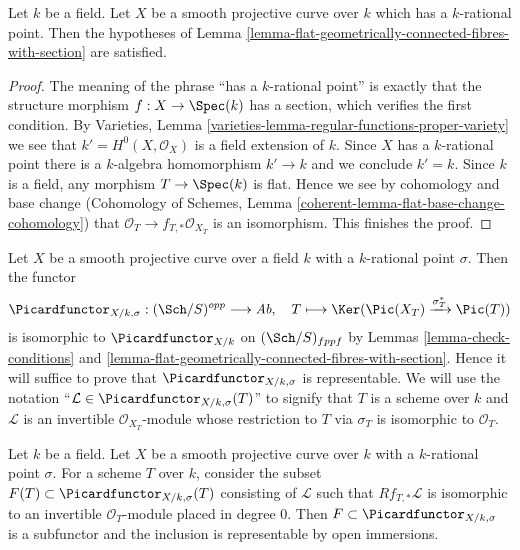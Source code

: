 \begin{lemma}
\label{lemma-check-conditions}
Let $k$ be a field. Let $X$ be a smooth projective curve over $k$
which has a $k$-rational point. Then the hypotheses of
Lemma \ref{lemma-flat-geometrically-connected-fibres-with-section}
are satisfied.
\end{lemma}

\begin{proof}
The meaning of the phrase ``has a $k$-rational point'' is exactly that
the structure morphism $f : X \to \Spec(k)$ has a section, which
verifies the first condition.
By Varieties, Lemma \ref{varieties-lemma-regular-functions-proper-variety}
we see that $k' = H^0(X, \mathcal{O}_X)$ is a field extension of $k$.
Since $X$ has a $k$-rational point there is a $k$-algebra homomorphism
$k' \to k$ and we conclude $k' = k$.
Since $k$ is a field, any morphism $T \to \Spec(k)$ is flat.
Hence we see by cohomology and base change
(Cohomology of Schemes, Lemma \ref{coherent-lemma-flat-base-change-cohomology})
that $\mathcal{O}_T \to f_{T, *}\mathcal{O}_{X_T}$ is an isomorphism.
This finishes the proof.
\end{proof}

\noindent
Let $X$ be a smooth projective curve over a field $k$ with a
$k$-rational point $\sigma$. Then the functor
$$
\Picardfunctor_{X/k, \sigma} : (\Sch/S)^{opp} \longrightarrow \textit{Ab},\quad
T \longmapsto \Ker(\Pic(X_T) \xrightarrow{\sigma_T^*} \Pic(T))
$$
is isomorphic to $\Picardfunctor_{X/k}$ on $(\Sch/S)_{fppf}$
by Lemmas \ref{lemma-check-conditions} and
\ref{lemma-flat-geometrically-connected-fibres-with-section}.
Hence it will suffice to prove that $\Picardfunctor_{X/k, \sigma}$
is representable. We will use the notation
``$\mathcal{L} \in \Picardfunctor_{X/k, \sigma}(T)$'' to signify that
$T$ is a scheme over $k$ and $\mathcal{L}$ is an invertible
$\mathcal{O}_{X_T}$-module whose restriction to $T$ via $\sigma_T$
is isomorphic to $\mathcal{O}_T$.

\begin{lemma}
\label{lemma-define-open}
Let $k$ be a field. Let $X$ be a smooth projective curve over $k$
with a $k$-rational point $\sigma$. For a scheme $T$ over $k$,
consider the subset $F(T) \subset \Picardfunctor_{X/k, \sigma}(T)$ consisting of
$\mathcal{L}$ such that $Rf_{T, *}\mathcal{L}$ is isomorphic to an invertible
$\mathcal{O}_T$-module placed in degree $0$. Then
$F \subset \Picardfunctor_{X/k, \sigma}$ is a subfunctor and the inclusion is
representable by open immersions.
\end{lemma}

